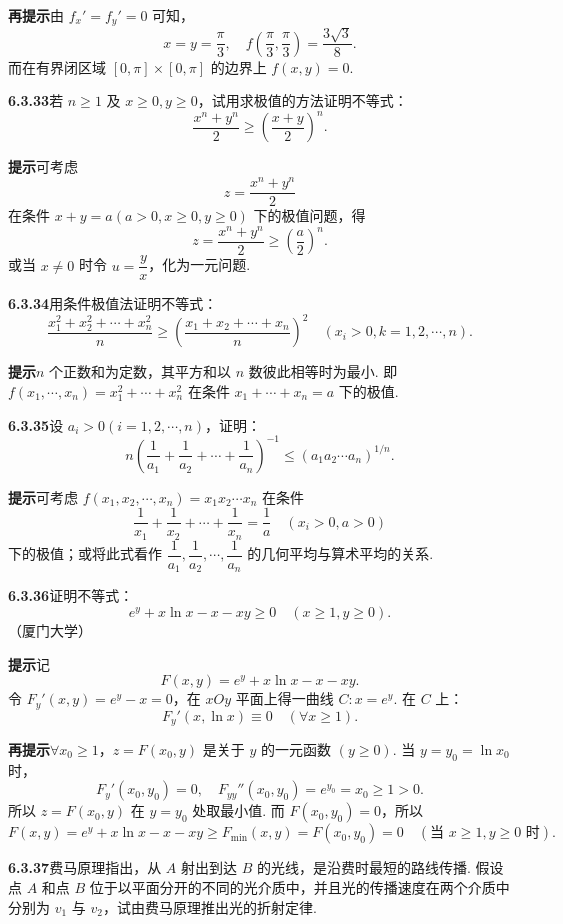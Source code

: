 \documentclass[UTF8, 12pt, fontset=fandol, oneside]{ctexart}
\begin{document}
\noindent\textbf{再提示}\quad 由 $f_x'=f_y'=0$ 可知，
\[
  x=y=\frac\pi3,\quad f\left(\frac\pi3,\frac\pi3\right)=\frac{3\sqrt3}{8}.
\]
而在有界闭区域 $[0,\pi]\times[0,\pi]$ 的边界上 $f(x,y)=0$.

\noindent\textbf{6.3.33}\quad 若 $n\ge1$ 及 $x\ge0,y\ge0$，试用求极值的方法证明不等式：
\[
  \frac{x^n+y^n}{2}\ge\left(\frac{x+y}{2}\right)^n.
\]

\noindent\textbf{提示}\quad 可考虑
\[
  z=\frac{x^n+y^n}{2}
\]
在条件 $x+y=a(a>0,x\ge0,y\ge0)$ 下的极值问题，得
\[
  z=\frac{x^n+y^n}{2}\ge\left(\frac a2\right)^n.
\]
或当 $x\ne0$ 时令 $u=\dfrac yx$，化为一元问题.

\noindent\textbf{6.3.34}\quad 用条件极值法证明不等式：
\[
  \frac{x_1^2+x_2^2+\cdots+x_n^2}{n}
  \ge
  \left(\frac{x_1+x_2+\cdots+x_n}{n}\right)^2
  \quad(x_i>0,k=1,2,\cdots,n).
\]

\noindent\textbf{提示}\quad $n$ 个正数和为定数，其平方和以 $n$ 数彼此相等时为最小. 即 $f(x_1,\cdots,x_n)=x_1^2+\cdots+x_n^2$ 在条件 $x_1+\cdots+x_n=a$ 下的极值.

\noindent\textbf{6.3.35}\quad 设 $a_i>0(i=1,2,\cdots,n)$，证明：
\[
  n\left(\frac1{a_1}+\frac1{a_2}+\cdots+\frac1{a_n}\right)^{-1}
  \le(a_1a_2\cdots a_n)^{1/n}.
\]

\noindent\textbf{提示}\quad 可考虑 $f(x_1,x_2,\cdots,x_n)=x_1x_2\cdots x_n$ 在条件
\[
  \frac1{x_1}+\frac1{x_2}+\cdots+\frac1{x_n}=\frac1a\quad(x_i>0,a>0)
\]
下的极值；或将此式看作 $\dfrac1{a_1},\dfrac1{a_2},\cdots,\dfrac1{a_n}$ 的几何平均与算术平均的关系.

\noindent\textbf{6.3.36}\quad 证明不等式：
\[
  e^y+x\ln x-x-xy\ge0\quad(x\ge1,y\ge0).
\]
（厦门大学）

\noindent\textbf{提示}\quad 记
\[
  F(x,y)=e^y+x\ln x-x-xy.
\]
令 $F_y'(x,y)=e^y-x=0$，在 $xOy$ 平面上得一曲线 $C:x=e^y$. 在 $C$ 上：
\[
  F_y'(x,\ln x)\equiv0\quad(\forall x\ge1).
\]

\noindent\textbf{再提示}\quad $\forall x_0\ge1$，$z=F(x_0,y)$ 是关于 $y$ 的一元函数 $(y\ge0)$. 当 $y=y_0=\ln x_0$ 时，
\[
  F_y'(x_0,y_0)=0,\quad F_{yy}''(x_0,y_0)=e^{y_0}=x_0\ge1>0.
\]
所以 $z=F(x_0,y)$ 在 $y=y_0$ 处取最小值. 而 $F(x_0,y_0)=0$，所以
\[
  F(x,y)=e^y+x\ln x-x-xy\ge F_{\min}(x,y)
  =F(x_0,y_0)=0\quad(\text{当 }x\ge1,y\ge0\text{ 时}).
\]

\noindent\textbf{6.3.37}\quad 费马原理指出，从 $A$ 射出到达 $B$ 的光线，是沿费时最短的路线传播. 假设点 $A$ 和点 $B$ 位于以平面分开的不同的光介质中，并且光的传播速度在两个介质中分别为 $v_1$ 与 $v_2$，试由费马原理推出光的折射定律.
\end{document}
